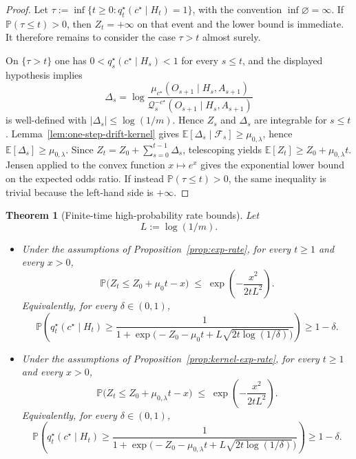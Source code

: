 \documentclass[11pt]{article}
\newtheorem{theorem}{Theorem}[section]
\theoremstyle{definition}
\theoremstyle{remark}
\newcommand{\Qcal}{\mathcal{Q}}
\newcommand{\E}{\mathbb{E}}
\newcommand{\Prob}{\mathbb{P}}
\begin{document}
\begin{proof}
Let $\tau:=\inf\{t\ge 0:q_t^\star(c^\star\mid H_t)=1\}$, with the convention $\inf\varnothing=\infty$. If $\Prob(\tau\le t)>0$, then $Z_t=+\infty$ on that event and the lower bound is immediate. It therefore remains to consider the case $\tau>t$ almost surely.

On $\{\tau>t\}$ one has $0<q_s^\star(c^\star\mid H_s)<1$ for every $s\le t$, and the displayed hypothesis implies
\[
\Delta_s=\log\frac{\mu_{c^\star}(O_{s+1}\mid H_s,A_{s+1})}{\Qcal_s^{-c^\star}(O_{s+1}\mid H_s,A_{s+1})}
\]
is well-defined with $|\Delta_s|\le \log(1/m)$. Hence $Z_s$ and $\Delta_s$ are integrable for $s\le t$. Lemma~\ref{lem:one-step-drift-kernel} gives $\E[\Delta_s\mid\mathcal F_s]\ge\mu_{0,\lambda}$, hence $\E[\Delta_s]\ge\mu_{0,\lambda}$. Since $Z_t=Z_0+\sum_{s=0}^{t-1}\Delta_s$, telescoping yields $\E[Z_t]\ge Z_0+\mu_{0,\lambda}t$. Jensen applied to the convex function $x\mapsto e^x$ gives the exponential lower bound on the expected odds ratio. If instead $\Prob(\tau\le t)>0$, the same inequality is trivial because the left-hand side is $+\infty$.
\end{proof}

\begin{theorem}[Finite-time high-probability rate bounds]
\label{thm:exp-rate-concentration}
Let
\[
L:=\log(1/m).
\]
\begin{itemize}
\item[(i)] Under the assumptions of Proposition~\ref{prop:exp-rate}, for every $t\ge 1$ and every $x>0$,
\[
\Prob\!\bigl(Z_t\le Z_0+\mu_0 t-x\bigr)
\;\le\;
\exp\!\left(-\frac{x^2}{2tL^2}\right).
\]
Equivalently, for every $\delta\in(0,1)$,
\[
\Prob\!\left(
q_t^\star(c^\star\mid H_t)\ge
\frac{1}{1+\exp\!\bigl(-Z_0-\mu_0 t+L\sqrt{2t\log(1/\delta)}\bigr)}
\right)\ge 1-\delta.
\]
\item[(ii)] Under the assumptions of Proposition~\ref{prop:kernel-exp-rate}, for every $t\ge 1$ and every $x>0$,
\[
\Prob\!\bigl(Z_t\le Z_0+\mu_{0,\lambda} t-x\bigr)
\;\le\;
\exp\!\left(-\frac{x^2}{2tL^2}\right).
\]
Equivalently, for every $\delta\in(0,1)$,
\[
\Prob\!\left(
q_t^\star(c^\star\mid H_t)\ge
\frac{1}{1+\exp\!\bigl(-Z_0-\mu_{0,\lambda} t+L\sqrt{2t\log(1/\delta)}\bigr)}
\right)\ge 1-\delta.
\]
\end{itemize}
\end{theorem}
\end{document}

